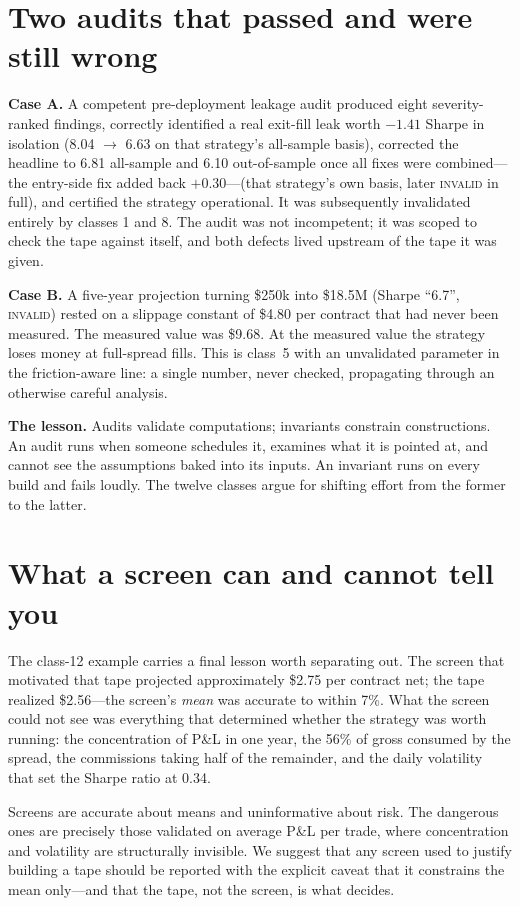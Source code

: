 \documentclass[11pt]{article}
\begin{document}
\section{Two audits that passed and were still wrong}
\textbf{Case A.} A competent pre-deployment leakage audit produced eight severity-ranked
findings, correctly identified a real exit-fill leak worth $-1.41$ Sharpe in isolation
(8.04 $\to$ 6.63 on that strategy's all-sample basis), corrected the headline to 6.81
all-sample and 6.10 out-of-sample once all fixes were combined---the entry-side fix added back
$+0.30$---(that strategy's own basis, later
\textsc{invalid} in full), and certified the strategy operational. It was subsequently
invalidated entirely by classes 1 and 8. The audit was not incompetent; it was scoped to check
the tape against itself, and both defects lived upstream of the tape it was given.

\textbf{Case B.} A five-year projection turning \$250k into \$18.5M (Sharpe ``6.7'',
\textsc{invalid}) rested on a slippage constant of \$4.80 per contract that had never been
measured. The measured value was \$9.68. At the measured value the strategy loses money at
full-spread fills. This is class~5 with an unvalidated parameter in the friction-aware line: a
single number, never checked, propagating through an otherwise careful analysis.

\textbf{The lesson.} Audits validate computations; invariants constrain constructions. An audit
runs when someone schedules it, examines what it is pointed at, and cannot see the assumptions
baked into its inputs. An invariant runs on every build and fails loudly. The twelve classes
argue for shifting effort from the former to the latter.

\section{What a screen can and cannot tell you}
The class-12 example carries a final lesson worth separating out. The screen that motivated
that tape projected approximately \$2.75 per contract net; the tape realized \$2.56---the
screen's \emph{mean} was accurate to within 7\%. What the screen could not see was everything
that determined whether the strategy was worth running: the concentration of P\&L in one year,
the 56\% of gross consumed by the spread, the commissions taking half of the remainder, and the
daily volatility that set the Sharpe ratio at 0.34.

Screens are accurate about means and uninformative about risk. The dangerous ones are precisely
those validated on average P\&L per trade, where concentration and volatility are structurally
invisible. We suggest that any screen used to justify building a tape should be reported with
the explicit caveat that it constrains the mean only---and that the tape, not the screen, is
what decides.
\end{document}
